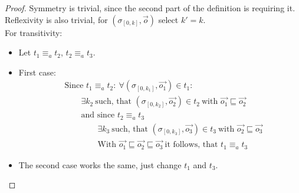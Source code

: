 \begin{proof}
    Symmetry is trivial, since the second part of the definition is requiring it.\\
    Reflexivity is also trivial, for \((\sigma_{[0,k]}, \vec{o})\) select \(k' = k\).\\
    For transitivity:
    \begin{itemize}[label = {}]
      \item Let \(t_1 \equiv_a t_2\), \(t_2 \equiv_a t_3\).
      \item First case:
        \begin{align*}
          &\text{Since } t_1 \equiv_a t_2:\ \forall (\sigma_{[0,k_1]}, \vec{o_1}) \in t_1: \\
          &\hspace{2em} \exists k_2\ \text{such, that } (\sigma_{[0,k_2]}, \vec{o_2}) \in t_2\ \text{with } \vec{o_1} \sqsubseteq \vec{o_2} \\
          &\hspace{2em} \text{and since } t_2 \equiv_a t_3 \\
          &\hspace{4em} \exists k_3\ \text{such, that } (\sigma_{[0,k_3]}, \vec{o_3}) \in t_3\ \text{with } \vec{o_2} \sqsubseteq \vec{o_3}\\
          &\hspace{4em} \text{With } \vec{o_1} \sqsubseteq \vec{o_2} \sqsubseteq \vec{o_3}\ \text{it follows, that } t_1 \equiv_a t_3
        \end{align*}
      \item The second case works the same, just change \(t_1\) and \(t_3\).
    \end{itemize}
\end{proof}

